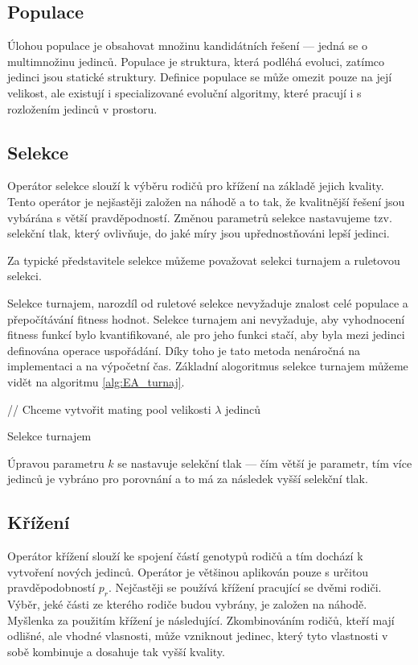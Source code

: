 \subsection{Populace}
Úlohou populace je obsahovat množinu kandidátních řešení --- jedná se o multimnožinu jedinců.
Populace je struktura, která podléhá evoluci, zatímco jedinci jsou statické struktury.
Definice populace se může omezit pouze na její velikost, ale existují i specializované evoluční algoritmy, které pracují i s rozložením jedinců v prostoru.


\subsection{Selekce}
Operátor selekce slouží k výběru rodičů pro křížení na základě jejich kvality.
Tento operátor je nejšastěji založen na náhodě a to tak, že kvalitnější řešení jsou vybárána s větší pravděpodností.
Změnou parametrů selekce nastavujeme tzv. selekční tlak, který ovlivňuje, do jaké míry jsou upřednostňováni lepší jedinci.

Za typické představitele selekce můžeme považovat selekci turnajem a ruletovou selekci.

Selekce turnajem, narozdíl od ruletové selekce nevyžaduje znalost celé populace a přepočítávání fitness hodnot.
Selekce turnajem ani nevyžaduje, aby vyhodnocení fitness funkcí bylo kvantifikované, ale pro jeho funkci stačí, aby byla mezi jedinci definována operace uspořádání.
Díky toho je tato metoda nenáročná na implementaci a na výpočetní čas.
Základní alogoritmus selekce turnajem můžeme vidět na algoritmu \ref{alg:EA_turnaj}.

\begin{algorithm}[H]
    // Chceme vytvořit mating pool velikosti $\lambda$ jedinců\;
    \caption{Selekce turnajem}
    \label{alg:EA_turnaj}
\end{algorithm}

Úpravou parametru $k$ se nastavuje selekční tlak --- čím větší je parametr, tím více jedinců je vybráno pro porovnání a to má za následek vyšší selekční tlak.

\subsection{Křížení}
Operátor křížení slouží ke spojení částí genotypů rodičů a tím dochází k vytvoření nových jedinců.
Operátor je většinou aplikován pouze s určitou pravděpodobností $p_r$.
Nejčastěji se používá křížení pracující se dvěmi rodiči.
Výběr, jeké části ze kterého rodiče budou vybrány, je založen na náhodě.
Myšlenka za použitím křížení je následující.
Zkombinováním rodičů, kteří mají odlišné, ale vhodné vlasnosti, může vzniknout jedinec, který tyto vlastnosti v sobě kombinuje a dosahuje tak vyšší kvality.

